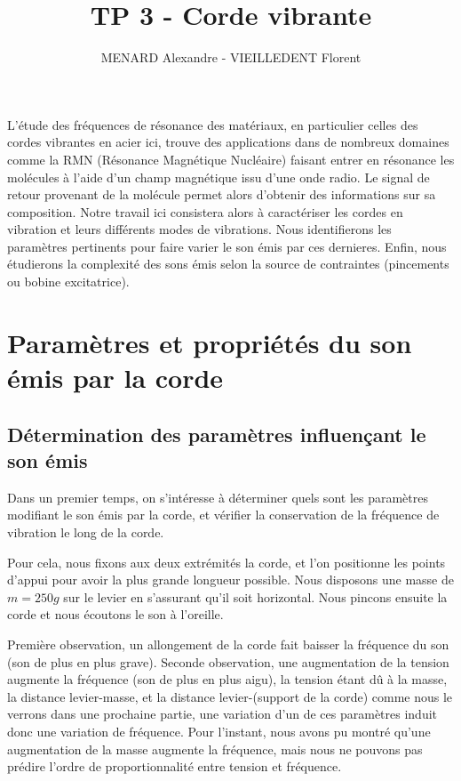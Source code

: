 \documentclass[11pt]{article}
\title{\vspace{-2cm}\textbf{TP 3 - Corde vibrante}}
\author{\vspace{-0.5cm}MENARD Alexandre - VIEILLEDENT Florent}
\date{\vspace{-0.7cm}}
\begin{document}
\maketitle

L'étude des fréquences de résonance des matériaux, en particulier celles des cordes vibrantes en acier ici, trouve des applications dans de nombreux domaines 
comme la RMN (Résonance Magnétique Nucléaire) faisant entrer en résonance les molécules à l'aide d'un champ magnétique issu d'une onde radio. Le signal de retour provenant
de la molécule permet alors d'obtenir des informations sur sa composition. 
Notre travail ici consistera alors à caractériser les cordes en vibration et leurs différents modes de vibrations. Nous identifierons les paramètres pertinents pour faire
varier le son émis par ces dernieres. Enfin, nous étudierons la complexité des sons émis selon la source de contraintes (pincements ou bobine excitatrice).

\section{Paramètres et propriétés du son émis par la corde}
\subsection{Détermination des paramètres influençant le son émis}

Dans un premier temps, on s'intéresse à déterminer quels sont les paramètres modifiant le son émis par la corde, et vérifier la conservation de la fréquence 
de vibration le long de la corde.

Pour cela, nous fixons aux deux extrémités la corde, et l'on positionne les points d'appui pour avoir la plus grande longueur possible. Nous disposons une masse de $m=250g$ sur le levier
en s'assurant qu'il soit horizontal. Nous pincons ensuite la corde et nous écoutons le son à l'oreille.

Première observation, un allongement de la corde fait baisser la fréquence du son (son de plus en plus grave). 
Seconde observation, une augmentation de la tension augmente la fréquence (son de plus en plus aigu), la tension étant dû à la masse, la distance levier-masse, et la distance
levier-(support de la corde) comme nous le verrons dans une prochaine partie, une variation d'un de ces paramètres induit donc une variation de fréquence. Pour l'instant, 
nous avons pu montré qu'une augmentation de la masse augmente la fréquence, mais nous ne pouvons pas prédire l'ordre de proportionnalité entre tension et fréquence.
\end{document}
